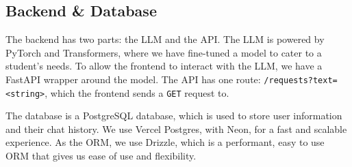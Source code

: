 \documentclass[9pt,a4paper,twocolumn,twoside]{tau-class/tau}
\begin{document}
\subsection{Backend \& Database}
The backend has two parts: the LLM and the API. The LLM is powered by PyTorch and Transformers, where we have fine-tuned a model to cater to a student's needs. To allow the frontend to interact with the LLM, we have a FastAPI wrapper around the model. The API has one route: \verb|/requests?text=<string>|, which the frontend sends a \verb|GET| request to.

The database is a PostgreSQL database, which is used to store user information and their chat history. We use Vercel Postgres, with Neon, for a fast and scalable experience. As the ORM, we use Drizzle, which is a performant, easy to use ORM that gives us ease of use and flexibility.
\end{document}
